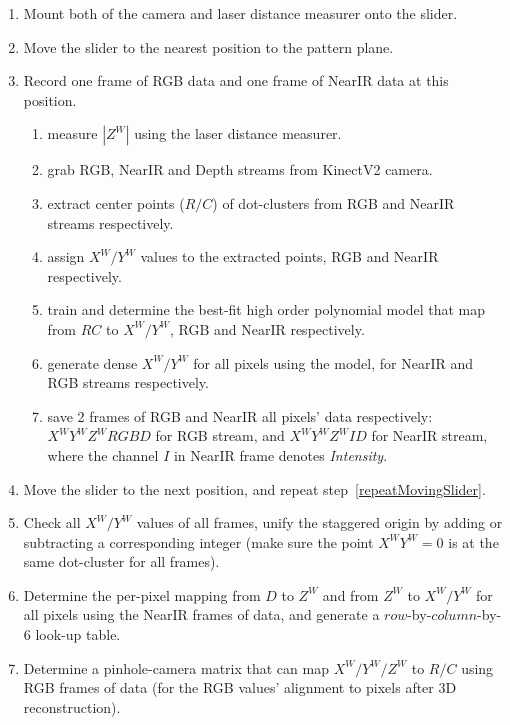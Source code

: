 \begin{enumerate}
   	\item Mount both of the camera and laser distance measurer onto the slider.
   	\item Move the slider to the nearest position to the pattern plane.
   	\item Record one frame of RGB data and one frame of NearIR data at this position.
   	\label{repeatMovingSlider}
   	\begin{enumerate}
     		\item measure \(|Z^W|\) using the laser distance measurer.
     		\item grab RGB, NearIR and Depth streams from KinectV2 camera.
     		\item extract center points (\(R/C\)) of dot-clusters from RGB and NearIR streams respectively.
     		\item assign \(X^W/Y^W\) values to the extracted points, RGB and NearIR respectively.
     		\item train and determine the best-fit high order polynomial model that map from \(RC\) to \(X^W/Y^W\), RGB and NearIR respectively.
     		\item generate dense \(X^W/Y^W\) for all pixels using the model, for NearIR and RGB streams respectively.
     		\item save 2 frames of RGB and NearIR all pixels' data respectively: \(X^WY^WZ^WRGBD\) for RGB stream, and \(X^WY^WZ^WID\) for NearIR stream, where the channel \(I\) in NearIR frame denotes \emph{Intensity}.
   	\end{enumerate}
	\item Move the slider to the next position, and repeat step~\ref{repeatMovingSlider}.
	\item Check all \(X^W/Y^W\) values of all frames, unify the staggered origin by adding or subtracting a corresponding integer (make sure the point \(X^WY^W = 0\) is at the same dot-cluster for all frames).
	\item Determine the per-pixel mapping from \(D\) to \(Z^W\) and from \(Z^W\) to \(X^W/Y^W\) for all pixels using the NearIR frames of data, and generate a \(row\)-by-\(column\)-by-6 look-up table.
	\item Determine a pinhole-camera matrix that can map \(X^W/Y^W/Z^W\) to \(R/C\) using RGB frames of data (for the RGB values' alignment to pixels after 3D reconstruction).
\end{enumerate}






